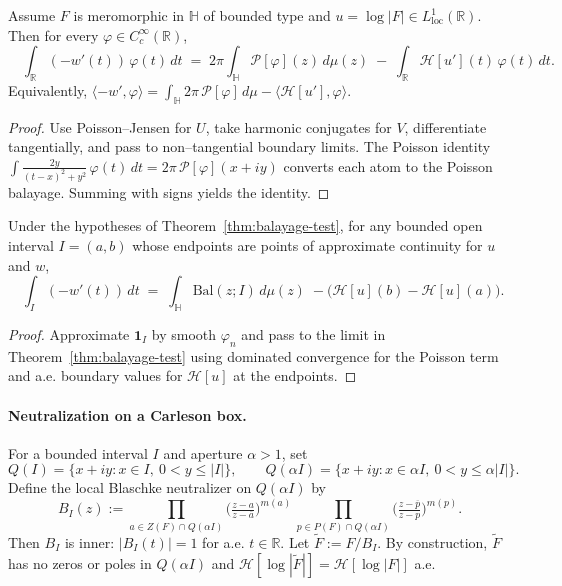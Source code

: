 \begin{theorem}\label{thm:balayage-test}
Assume $F$ is meromorphic in $\mathbb{H}$ of bounded type and $u=\log|F|\in L^1_{\mathrm{loc}}(\mathbb{R})$. Then for every $\varphi\in C_c^\infty(\mathbb{R})$,
\[
\boxed{\quad
\int_{\mathbb{R}} (-w'(t))\,\varphi(t)\,dt
\;=\;
2\pi\int_{\mathbb{H}} \mathcal{P}[\varphi](z)\,d\mu(z)\;-
\;\int_{\mathbb{R}}\mathcal{H}[u'](t)\,\varphi(t)\,dt.
\quad}
\]
Equivalently, $\langle -w',\varphi\rangle=\int_{\mathbb{H}} 2\pi\,\mathcal{P}[\varphi]\,d\mu-\langle \mathcal{H}[u'],\varphi\rangle$.
\end{theorem}

\begin{proof}
Use Poisson--Jensen for $U$, take harmonic conjugates for $V$, differentiate tangentially, and pass to non--tangential boundary limits. The Poisson identity
$\int \tfrac{2y}{(t-x)^2+y^2}\,\varphi(t)\,dt=2\pi\,\mathcal P[\varphi](x+iy)$ converts each atom to the Poisson balayage. Summing with signs yields the identity.
\end{proof}

\begin{corollary}\label{cor:balayage-interval}
Under the hypotheses of Theorem~\ref{thm:balayage-test}, for any bounded open interval $I=(a,b)$ whose endpoints are points of approximate continuity for $u$ and $w$,
\[
\boxed{\quad
\int_{I} (-w'(t))\,dt
\;=\;\int_{\mathbb{H}}\mathrm{Bal}(z;I)\,d\mu(z)
\;-
\big(\mathcal{H}[u](b)-\mathcal{H}[u](a)\big).
\quad}
\]
\end{corollary}

\begin{proof}
Approximate $\mathbf{1}_I$ by smooth $\varphi_n$ and pass to the limit in Theorem~\ref{thm:balayage-test} using dominated convergence for the Poisson term and a.e. boundary values for $\mathcal H[u]$ at the endpoints.
\end{proof}

\paragraph{Neutralization on a Carleson box.}
For a bounded interval $I$ and aperture $\alpha>1$, set
\[
Q(I)=\{x+iy : x\in I,\ 0<y\le |I|\},\qquad Q(\alpha I)=\{x+iy : x\in \alpha I,\ 0<y\le \alpha|I|\}.
\]
Define the local Blaschke neutralizer on $Q(\alpha I)$ by
\[
B_I(z):=\prod_{a\in Z(F)\cap Q(\alpha I)} \Big(\tfrac{z-a}{z-\overline{a}}\Big)^{m(a)}\,
\prod_{p\in P(F)\cap Q(\alpha I)} \Big(\tfrac{z-\overline{p}}{z-p}\Big)^{m(p)}.
\]
Then $B_I$ is inner: $|B_I(t)|=1$ for a.e. $t\in\mathbb{R}$. Let $\widetilde F:=F/B_I$. By construction, $\widetilde F$ has no zeros or poles in $Q(\alpha I)$ and $\mathcal H[\log|\widetilde F|]=\mathcal H[\log|F|]$ a.e.

